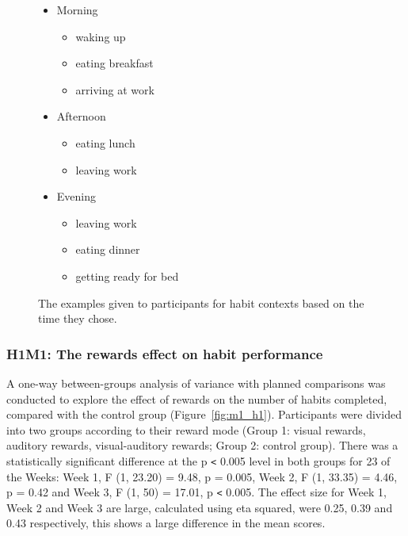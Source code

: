 \begin{figure}[H]
  \centering
  \begin{itemize}
    \item Morning
    \begin{itemize}
      \item waking up
      \item eating breakfast
      \item arriving at work
    \end{itemize}
    \item Afternoon
    \begin{itemize}
      \item eating lunch
      \item leaving work
    \end{itemize}
    \item Evening
    \begin{itemize}
      \item leaving work
      \item eating dinner
      \item getting ready for bed
    \end{itemize}
  \end{itemize}
  \caption{The examples given to participants for habit contexts based on the time they chose.}
  \label{fig:habit_context_example}
\end{figure}



\subsubsection*{H1M1: The rewards effect on habit performance}

A one-way between-groups analysis of variance with planned comparisons was conducted to explore the effect of rewards on the number of habits completed, compared with the control group (Figure~\ref{fig:m1_h1}). Participants were divided into two groups according to their reward mode (Group 1: visual rewards, auditory rewards, visual-auditory rewards; Group 2: control group). There was a statistically significant difference at the p \verb|<| 0.005 level in both groups for 2\/3 of the Weeks: Week 1, F (1, 23.20) = 9.48, p = 0.005, Week 2, F (1, 33.35) = 4.46, p = 0.42 and Week 3, F (1, 50) = 17.01, p \verb|<| 0.005. The effect size for Week 1, Week 2 and Week 3 are large, calculated using eta squared, were 0.25, 0.39 and 0.43 respectively, this shows a large difference in the mean scores.


